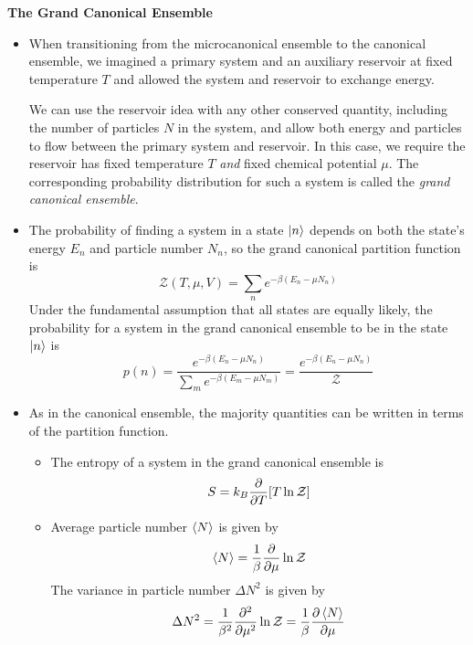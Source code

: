 \documentclass[11pt, a4paper]{article}
\begin{document}
\textbf{The Grand Canonical Ensemble}
\begin{itemize}
	\item When transitioning from the microcanonical ensemble to the canonical ensemble, we imagined a primary system and an auxiliary reservoir at fixed temperature $ T $ and allowed the system and reservoir to exchange energy.
	
	We can use the reservoir idea with any other conserved quantity, including the number of particles $ N $ in the system, and allow both energy and particles to flow between the primary system and reservoir. In this case, we require the reservoir has fixed temperature $ T $ \textit{and} fixed chemical potential $ \mu $. The corresponding probability distribution for such a system is called the \textit{grand canonical ensemble}.
	
	\item The probability of finding a system in a state $ \ket{n} $ depends on both the state's energy $ E_{n} $ and particle number $ N_{n} $, so the grand canonical partition function is
	\begin{equation*}
		\mathcal{Z}(T, \mu, V) = \sum_{n}e^{-\beta(E_{n} - \mu N_{n})}
	\end{equation*}
	Under the fundamental assumption that all states are equally likely, the probability for a system in the grand canonical ensemble to be in the state $ \ket{n} $ is
	\begin{equation*}
		p(n) = \frac{e^{-\beta(E_{n} - \mu N_{n})}}{\sum_{m}e^{-\beta(E_{m} - \mu N_{m})}} = \frac{e^{-\beta(E_{n} - \mu N_{n})}}{\mathcal{Z}}
	\end{equation*}
	
	\item As in the canonical ensemble, the majority quantities can be written in terms of the partition function. 
	\begin{itemize}
		\item The entropy of a system in the grand canonical ensemble is
		\begin{equation*}
			S = k_{B}\pdv{}{T}[T \ln \mathcal{Z}]
		\end{equation*}
		
		\item Average particle number $ \expval{N} $ is given by
		\begin{equation*}
			\expval{N} = \frac{1}{\beta} \pdv{}{\mu}\ln \mathcal{Z}
		\end{equation*}
		The variance in particle number $ \Delta N^{2} $ is given by
		\begin{equation*}
			\Delta N^{2} = \frac{1}{\beta^{2}}\pdv[2]{}{\mu} \ln \mathcal{Z} = \frac{1}{\beta}\pdv{\expval{N}}{\mu}
		\end{equation*}
		

\end{itemize}
\end{itemize}
\end{document}
